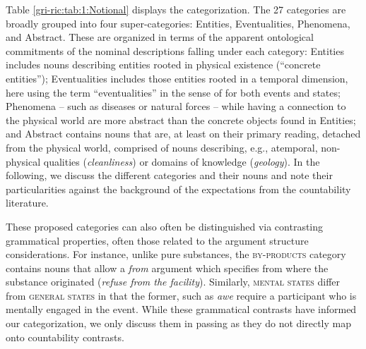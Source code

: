 \documentclass[output=paper]{langscibook}
\begin{document}
Table \ref{gri-ric:tab:1:Notional} displays the categorization.  The 27 categories are broadly grouped into four super-categories: Entities, Eventualities, Phenomena, and Abstract.  These are organized in terms of the apparent ontological commitments of the nominal descriptions falling under each category: Entities includes nouns describing entities rooted in physical existence (``concrete entities''); Eventualities includes those entities rooted in a temporal dimension, here using the term ``eventualities'' in the sense of \citet{Bach1986} for both events and states; Phenomena -- such as diseases or natural forces -- while having a connection to the physical world are more abstract than the concrete objects found in Entities; and Abstract contains nouns that are, at least on their primary reading, detached from the physical world, comprised of nouns describing, e.g., atemporal, non-physical qualities (\textit{cleanliness}) or domains of knowledge (\textit{geology}).     In the following, we discuss the different categories and their nouns and note their particularities against the background of the expectations from the countability literature.%

These proposed categories can also often be distinguished via contrasting grammatical properties, often those related to the argument structure considerations.  For instance, unlike pure substances, the \textsc{by-products} category contains nouns that allow a \textit{from} argument which specifies from where the substance originated (\textit{refuse from the facility}).  Similarly, \textsc{mental states} differ from \textsc{general states} in that the former, such as \textit{awe} require a participant who is mentally engaged in the event.  While these grammatical contrasts have informed our categorization, we only discuss them in passing as they do not directly map onto countability contrasts.
\end{document}
